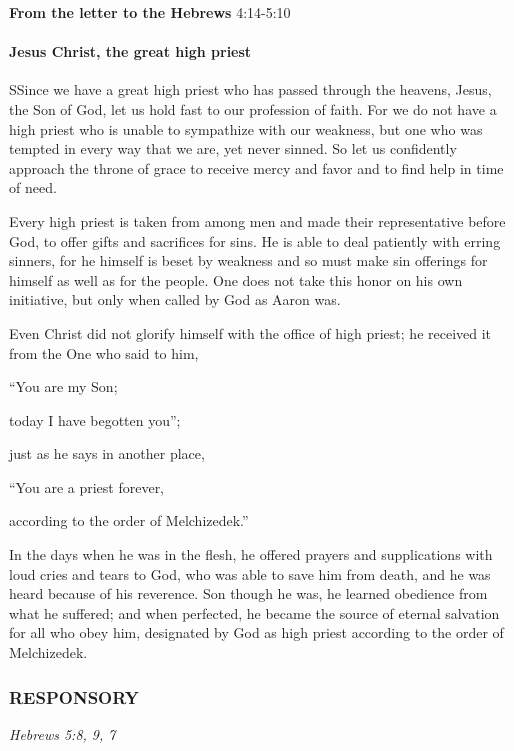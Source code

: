 \textbf{From the letter to the Hebrews} \hfill 4:14-5:10

\paragraph{Jesus Christ, the great high priest}

\lettrine[lines=3]{S}{}Since we have a great high priest who has passed through the heavens, Jesus, the Son of God, let us hold fast to our profession of faith. For we do not have a high priest who is unable to sympathize with our weakness, but one who was tempted in every way that we are, yet never sinned. So let us confidently approach the throne of grace to receive mercy and favor and to find help in time of need.

Every high priest is taken from among men and made their representative before God, to offer gifts and sacrifices for sins. He is able to deal patiently with erring sinners, for he himself is beset by weakness and so must make sin offerings for himself as well as for the people. One does not take this honor on his own initiative, but only when called by God as Aaron was.

Even Christ did not glorify himself with the office of high priest; he received it from the One who said to him,

\vspace{5pt}
   “You are my Son; \par
      today I have begotten you”;

\vspace{5pt}

just as he says in another place,

\vspace{5pt}

   “You are a priest forever,\par
      according to the order of Melchizedek.”

\vspace{5pt}

In the days when he was in the flesh, he offered prayers and supplications with loud cries and tears to God, who was able to save him from death, and he was heard because of his reverence. Son though he was, he learned obedience from what he suffered; and when perfected, he became the source of eternal salvation for all who obey him, designated by God as high priest according to the order of Melchizedek.

\subsubsection{RESPONSORY}
\hfill \emph{Hebrews 5:8, 9, 7}


